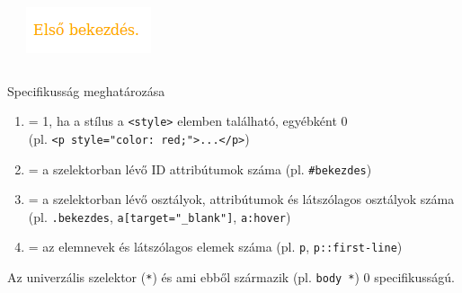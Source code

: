 \begin{frame}
  \begin{exampleblock}{}
    \scriptsize
    
  \end{exampleblock}
  \begin{columns}[T]
      \begin{exampleblock}{}
        \scriptsize
        
      \end{exampleblock}
      \includegraphics[width=.66\textwidth]{utkozes2.png}
  \end{columns} 
\end{frame}

\begin{frame}
  Specifikusság meghatározása
  \begin{enumerate}
    \renewcommand{\theenumi}{\Alph{enumi}}
    \item = 1, ha a stílus a \texttt{<style>} elemben található, egyébként 0\\(pl. \texttt{<p style="color: red;">...</p>})
    \item = a szelektorban lévő ID attribútumok száma (pl. \texttt{\#bekezdes})
    \item = a szelektorban lévő osztályok, attribútumok és látszólagos osztályok száma\\(pl. \texttt{.bekezdes}, \texttt{a[target="\_blank"]}, \texttt{a:hover})
    \item = az elemnevek és látszólagos elemek száma (pl. \texttt{p}, \texttt{p::first-line})
  \end{enumerate}
  Az univerzális szelektor (\texttt{*}) és ami ebből származik (pl. \texttt{body *}) 0 specifikusságú.
\end{frame}

